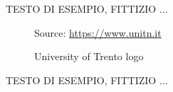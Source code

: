 TESTO DI ESEMPIO, FITTIZIO ... \\

\begin{figure} %
  \centering
  \def\stackalignment{l} %
  {\scriptsize \parbox[t]{\linewidth}{ Source: \url{https://www.unitn.it}} }
  \caption{University of Trento logo}
  \label{fig:unitn_wrapfigure_left}
\end{figure}

TESTO DI ESEMPIO, FITTIZIO ...